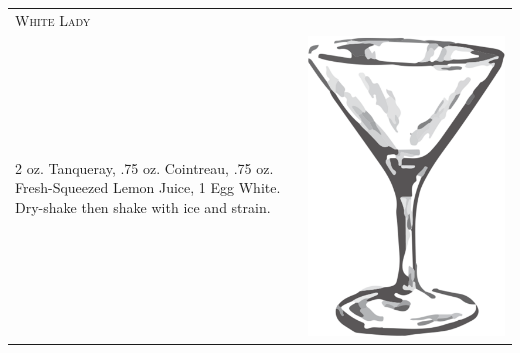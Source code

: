 \documentclass{article}
\begin{document}
\begin{tabular}{p{2in} p{0.5in}}
  \multicolumn{2}{p{3in}}{\centering\Huge\textsc{White Lady}} \\ 
   \vspace{-0.1in}2 oz. Tanqueray, .75 oz. Cointreau, .75 oz. Fresh-Squeezed Lemon Juice, 1 Egg White. Dry-shake then shake with ice and strain.&
   \vspace{-0.1in} \includegraphics{goblet.png}
\end{tabular}
\end{document}
